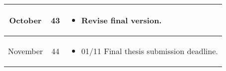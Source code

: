 \begin{longtable}{| c | c | m{10cm} |}
        \hline
        October & 43 & \begin{itemize}
                            \item Revise final version.
                        \end{itemize}\\
        \hline
        November & 44 & \begin{itemize}
                            \item 01/11 Final thesis submission deadline.
                        \end{itemize}\\ 
        \hline
\end{longtable}